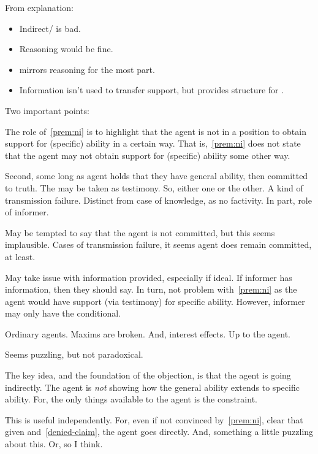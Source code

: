 \begin{note}[Overview]
  From explanation:
  \begin{itemize}
  \item Indirect/\AR{} is bad.
  \item Reasoning would be fine.
  \item \WR{} mirrors reasoning for the most part.
  \item Information isn't used to transfer support, but provides structure for \WR{}.
  \end{itemize}
  
\end{note}

\begin{note}
  Two important points:

  The role of~\ref{prem:ni} is to highlight that the agent is not in a position to obtain support for (specific) ability in a certain way.
  That is,~\ref{prem:ni} does not state that the agent may not obtain support for (specific) ability some other way.

  Second, some long as agent holds that they have general ability, then committed to truth.
  The \gen{} may be taken as testimony.
  So, either one or the other.
  A kind of transmission failure.
  Distinct from case of knowledge, as no factivity.
  In part, role of informer.

  May be tempted to say that the agent is not committed, but this seems implausible.
  Cases of transmission failure, it seems agent does remain committed, at least.

  May take issue with information provided, especially if ideal.
  If informer has information, then they should say.
  In turn, not problem with~\ref{prem:ni} as the agent would have support (via testimony) for specific ability.
  However, informer may only have the conditional.

  Ordinary agents.
  Maxims are broken.
  And, interest effects.
  Up to the agent.

  Seems puzzling, but not paradoxical.
\end{note}

\begin{note}
  The key idea, and the foundation of the objection, is that the agent is going indirectly.
  The agent is \emph{not} showing how the general ability extends to specific ability.
  For, the only things available to the agent is the constraint.

  This is useful independently.
  For, even if not convinced by~\ref{prem:ni}, clear that given \gsi{} and~\ref{denied-claim}, the agent goes directly.
  And, something a little puzzling about this.
  Or, so I think.
\end{note}

